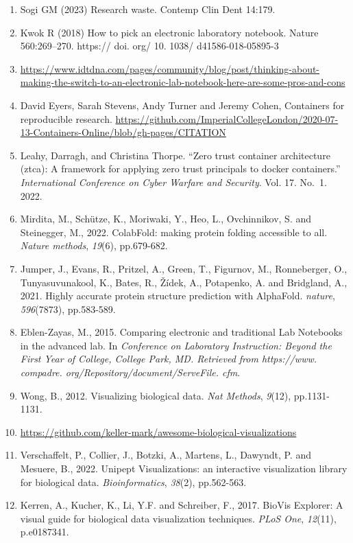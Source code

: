 \documentclass[
  letterpaper,
]{book}
\begin{document}
\begin{enumerate}
\item
  Sogi GM (2023) Research waste. Contemp Clin Dent 14:179.
\item
  Kwok R (2018) How to pick an electronic laboratory notebook. Nature
  560:269--270. https:// doi. org/ 10. 1038/ d41586-018-05895-3
\item
  \url{https://www.idtdna.com/pages/community/blog/post/thinking-about-making-the-switch-to-an-electronic-lab-notebook-here-are-some-pros-and-cons}
\item
  David Eyers, Sarah Stevens, Andy Turner and Jeremy Cohen, Containers
  for reproducible research.
  \url{https://github.com/ImperialCollegeLondon/2020-07-13-Containers-Online/blob/gh-pages/CITATION}
\item
  Leahy, Darragh, and Christina Thorpe. ``Zero trust container
  architecture (ztca): A framework for applying zero trust principals to
  docker containers.'' \emph{International Conference on Cyber Warfare
  and Security}. Vol. 17. No.~1. 2022.
\item
  Mirdita, M., Schütze, K., Moriwaki, Y., Heo, L., Ovchinnikov, S. and
  Steinegger, M., 2022. ColabFold: making protein folding accessible to
  all. \emph{Nature methods}, \emph{19}(6), pp.679-682.
\item
  Jumper, J., Evans, R., Pritzel, A., Green, T., Figurnov, M.,
  Ronneberger, O., Tunyasuvunakool, K., Bates, R., Žídek, A., Potapenko,
  A. and Bridgland, A., 2021. Highly accurate protein structure
  prediction with AlphaFold. \emph{nature}, \emph{596}(7873),
  pp.583-589.
\item
  Eblen-Zayas, M., 2015. Comparing electronic and traditional Lab
  Notebooks in the advanced lab. In \emph{Conference on Laboratory
  Instruction: Beyond the First Year of College, College Park, MD.
  Retrieved from https://www. compadre.
  org/Repository/document/ServeFile. cfm}.
\item
  Wong, B., 2012. Visualizing biological data. \emph{Nat Methods},
  \emph{9}(12), pp.1131-1131.
\item
  \url{https://github.com/keller-mark/awesome-biological-visualizations}
\item
  Verschaffelt, P., Collier, J., Botzki, A., Martens, L., Dawyndt, P.
  and Mesuere, B., 2022. Unipept Visualizations: an interactive
  visualization library for biological data. \emph{Bioinformatics},
  \emph{38}(2), pp.562-563.
\item
  Kerren, A., Kucher, K., Li, Y.F. and Schreiber, F., 2017. BioVis
  Explorer: A visual guide for biological data visualization techniques.
  \emph{PLoS One}, \emph{12}(11), p.e0187341.
\end{enumerate}
\end{document}
